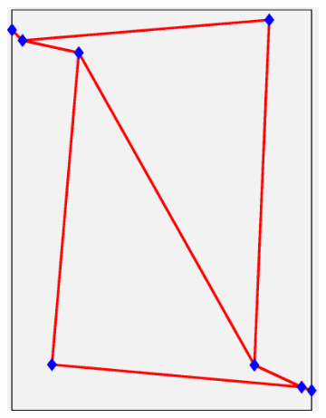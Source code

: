 \documentclass[11pt,letterpaper]{article}
\begin{document}
\begin{figure}[!h]
\begin{subfigure}{0.2\textwidth}
\includegraphics[width=\linewidth]{parallelTwoPareto_sim25.eps}
\caption{}
\end{subfigure}
\begin{subfigure}{0.2\textwidth}

\end{subfigure}
\end{figure}
\end{document}
